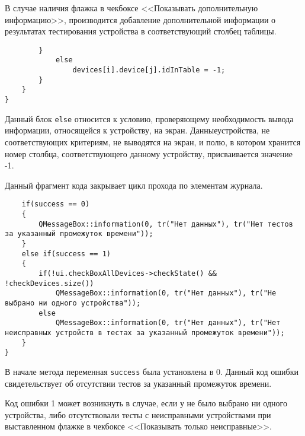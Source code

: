 В случае наличия флажка в чекбоксе <<Показывать дополнительную информацию>>, производится добавление дополнительной
информации о результатах тестирования устройства в соответствующий столбец таблицы.
\medskip
\begin{verbatim}
		}
			else
				devices[i].device[j].idInTable = -1;
		}
	}
}
\end{verbatim}
\medskip

Данный блок \texttt{else} относится к условию, проверяющему необходимость вывода информации, относящейся к
устройству, на экран. Данные\break устройства, не соответствующих критериям, не выводятся на экран, и полю, в котором хранится
номер столбца, соответствующего данному устройству, присваивается значение -1.

Данный фрагмент кода закрывает цикл прохода по элементам журнала.
\medskip
\begin{verbatim}
	if(success == 0)
	{
		QMessageBox::information(0, tr("Нет данных"), tr("Нет тестов за указанный промежуток времени"));
	}
	else if(success == 1)
	{
		if(!ui.checkBoxAllDevices->checkState() && !checkDevices.size())
			QMessageBox::information(0, tr("Нет данных"), tr("Не выбрано ни одного устройства"));
		else
			QMessageBox::information(0, tr("Нет данных"), tr("Нет неисправных устройств в тестах за указанный промежуток времени"));
	}
}
\end{verbatim}
\medskip

В начале метода переменная \texttt{success} была установлена в 0. Данный код ошибки свидетельствует об отсутствии тестов
за указанный промежуток времени.

Код ошибки 1 может возникнуть в случае, если у не было выбрано ни одного устройства, либо отсутствовали тесты с
неисправными устройствами при выставленном флажке в чекбоксе <<Показывать только неисправные>>.
